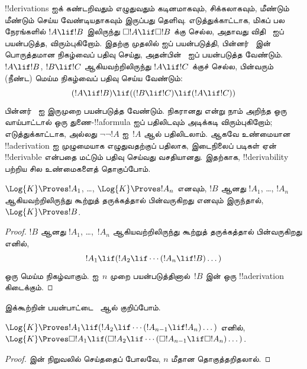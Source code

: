 \documentclass[../../../include/open-logic-section]{subfiles}
\begin{document}


!!{derivation}s ஐக் கண்டறிவதும் எழுதுவதும் கடினமாகவும், சிக்கலாகவும்,
மீண்டும் மீண்டும் செய்ய வேண்டியதாகவும் இருப்பது தெளிவு. எடுத்துக்காட்டாக,
மிகப் பல நேரங்களில் $!A \lif !B$ இலிருந்து $\Box !A \lif \Box !B$ க்கு
செல்ல, அதாவது விதி~\RK{} ஐப் பயன்படுத்த, விரும்புகிறோம். இதற்கு முதலில்
\Nec{} ஐப் பயன்படுத்தி, பின்னர்~ இன் பொருத்தமான நிகழ்வைப் பதிவு
செய்து, அதன்பின்~\MP{} ஐப் பயன்படுத்த வேண்டும். $!A \lif !B$,
$!B \lif !C$ ஆகியவற்றிலிருந்து $!A \lif !C$ க்குச் செல்ல, பின்வரும்
(நீண்ட) மெய்ம நிகழ்வைப் பதிவு செய்ய வேண்டும்:
\[
(!A \lif !B) \lif ((!B \lif !C) \lif (!A \lif !C))
\]
பின்னர்~\MP{} ஐ இருமுறை பயன்படுத்த வேண்டும். நிகரானது என்று நாம் அறிந்த
ஒரு வாய்பாட்டால் ஒரு துணை-!!a{formula} ஐப் பதிலிடவும் அடிக்கடி
விரும்புகிறோம்; எடுத்துக்காட்டாக,
 அல்லது $\lnot\lnot !A$ ஐ~$!A$ ஆல் பதிலிடலாம்.
ஆகவே உண்மையான !!a{derivation} ஐ முழுமையாக எழுதுவதற்குப் பதிலாக,
இடைநிலைப் படிகள் ஏன் !!{derivable} என்பதை மட்டும் பதிவு செய்வது வசதியானது.
இதற்காக, !!{derivability} பற்றிய சில உண்மைகளைத் தொகுப்போம்.

\begin{prop}
  $\Log{K} \Proves !A_1$, \dots, $\Log{K} \Proves !A_n$ எனவும்,
  $!B$ ஆனது $!A_1$, \dots, $!A_n$ ஆகியவற்றிலிருந்து கூற்றுத் தருக்கத்தால்
  பின்வருகிறது எனவும் இருந்தால், $\Log{K} \Proves !B$.
\end{prop}

\begin{proof}
  $!B$ ஆனது $!A_1$, \dots,~$!A_n$ ஆகியவற்றிலிருந்து கூற்றுத் தருக்கத்தால்
  பின்வருகிறது எனில்,
  \[
  !A_1 \lif (!A_2 \lif \cdots (!A_n \lif !B)\dots)
  \]
  ஒரு மெய்ம நிகழ்வாகும். \MP{} ஐ~$n$ முறை பயன்படுத்தினால்~$!B$ இன்
  ஒரு !!a{derivation} கிடைக்கும்.
\end{proof}

இக்கூற்றின் பயன்பாட்டை~\PL{} ஆல் குறிப்போம்.

\begin{prop}
  $\Log{K} \Proves !A_1 \lif (!A_2 \lif \cdots (!A_{n-1} \lif
  !A_n)\dots)$ எனில், $\Log{K} \Proves \Box !A_1 \lif (\Box !A_2 \lif
  \cdots (\Box !A_{n-1} \lif \Box !A_n)\dots)$.
\end{prop}

\begin{proof}
   இன் நிறுவலில் செய்ததைப் போலவே, $n$ மீதான
  தொகுத்தறிதலால்.
\end{proof}
\end{document}
